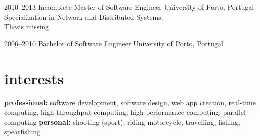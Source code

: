 \documentclass[]{friggeri-cv} %
\begin{document}
\begin{entrylist}


\entryedu
{2010--2013}
{Incomplete Master {\normalfont of Software Engineer}}
{University of Porto, Portugal}
{Specialization in Network and Distributed Systems.\\Thesis missing}


\entryedu
{2006--2010}
{Bachelor {\normalfont of Software Engineer}}
{University of Porto, Portugal}
{}


\end{entrylist}


\section{interests}

\textbf{professional:} software development, software design, web app creation, real-time computing, high-throughput computing,  high-performance computing, parallel computing \textbf{personal:} shooting (sport), riding motorcycle, travelling, fishing, spearfishing
\end{document}
